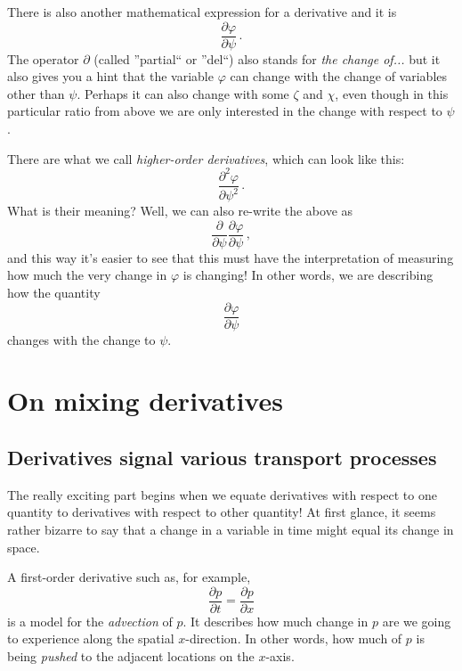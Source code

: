 There is also another mathematical expression for a derivative and it is
\begin{equation*}\label{eq:change-partial}
\frac{\partial \varphi}{\partial \psi} \, .
\end{equation*}
The operator $\partial$ (called ''partial`` or ''del``) also stands for \textit{the change of...} but it also gives you a hint that the variable $\varphi$ can change with the change of variables other than $\psi$. Perhaps it can also change with some $\zeta$ and $\chi$, even though in this particular ratio from above we are only interested in the change with respect to $\psi$.

There are what we call \textit{higher-order derivatives}, which can look like this:
\begin{equation*}\label{eq:change-partial-2nd}
\frac{\partial^2 \varphi}{\partial \psi^2} \, .
\end{equation*}
What is their meaning? Well, we can also re-write the above as
\begin{equation*}\label{eq:change-partial}
\frac{\partial}{\partial \psi} \frac{\partial \varphi}{\partial \psi} \, ,
\end{equation*}
and this way it's easier to see that this must have the interpretation of measuring how much the very change in $\varphi$ is changing! In other words, we are describing how the quantity 
\begin{equation*}\label{eq:second-derivative}
\frac{\partial \varphi}{\partial \psi}
\end{equation*}
changes with the change to $\psi$. 

\section{On mixing derivatives} \label{sec:changes:mixing-derivatives}



\subsection{Derivatives signal various transport processes}

The really exciting part begins when we equate derivatives with respect to one quantity to derivatives with respect to other quantity! At first glance, it seems rather bizarre to say that a change in a variable in time might equal its change in space.

A first-order derivative such as, for example,
\begin{equation*}\label{eq:change-partial-1st}
\frac{\partial p}{\partial t} = \frac{\partial p}{\partial x}
\end{equation*}
is a model for the \textit{advection} of $p$. It describes how much change in $p$ are we going to experience along the spatial $x$-direction. In other words, how much of $p$ is being \textit{pushed} to the adjacent locations on the $x$-axis.


